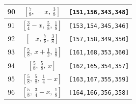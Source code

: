 \documentclass[fleqn,8pt]{jsarticle}
\begin{document}
\begin{longtable}{ccc}
90 & $\left[ \frac{7}{8},\, - x,\, \frac{3}{8} \right]$ & {\tt [151,156,343,348]} \\ \hline
91 & $\left[ \frac{3}{4} - x,\, \frac{5}{8},\, \frac{1}{8} \right]$ & {\tt [153,154,345,346]} \\ \hline
92 & $\left[ - x,\, \frac{7}{8},\, \frac{3}{8} \right]$ & {\tt [157,158,349,350]} \\ \hline
93 & $\left[ \frac{5}{8},\, x + \frac{1}{2},\, \frac{1}{8} \right]$ & {\tt [161,168,353,360]} \\ \hline
94 & $\left[ \frac{5}{8},\, \frac{5}{8},\, x \right]$ & {\tt [162,165,354,357]} \\ \hline
95 & $\left[ \frac{5}{8},\, \frac{5}{8},\, \frac{1}{4} - x \right]$ & {\tt [163,167,355,359]} \\ \hline
96 & $\left[ \frac{5}{8},\, \frac{3}{4} - x,\, \frac{1}{8} \right]$ & {\tt [164,166,356,358]} \\
\end{longtable}
\renewcommand{\arraystretch}{1.2}
\end{document}
